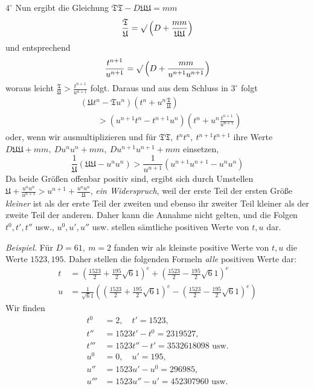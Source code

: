 \(4^\circ\) Nun ergibt die Gleichung \(\mathfrak{TT}-D\mathfrak{UU}=mm\)
\[
\frac{\mathfrak{T}}{\mathfrak{U}}=\surd\left(D+\frac{mm}{\mathfrak{UU}}\right)
\]
und entsprechend
\[
\frac{t^{n+1}}{u^{n+1}}=\surd\left(D+\frac{mm}{u^{n+1}u^{n+1}}\right)
\]
woraus leicht \(\frac{\mathfrak{T}}{\mathfrak{U}}>\frac{t^{n+1}}{u^{n+1}}\) folgt. Daraus und aus dem Schluss in \(3^\circ\) folgt
\[
\begin{aligned}&(\mathfrak{U}t^n-\mathfrak{T}u^n)\left(t^n+u^n\frac{\mathfrak{T}}{\mathfrak{U}}\right)\\&\qquad>(u^{n+1}t^n-t^{n+1}u^n)\left(t^n+u^n\frac{t^{n+1}}{u^{n+1}}\right)\end{aligned}
\]
oder, wenn wir ausmultiplizieren und für \(\mathfrak{TT},\ t^n t^n,\ t^{n+1}t^{n+1}\) ihre Werte \(D\mathfrak{UU}+mm,\ Du^n u^n+mm,\ Du^{n+1}u^{n+1}+mm\) einsetzen,
\[
\frac1{\mathfrak{U}}(\mathfrak{UU}-u^n u^n)>\frac1{u^{n+1}}(u^{n+1}u^{n+1}-u^n u^n)
\]
Da beide Größen offenbar positiv sind, ergibt sich durch Umstellen \(\mathfrak{U}+\frac{u^n u^n}{u^{n+1}}>u^{n+1}+\frac{u^n u^n}{\mathfrak{U}}\), \textit{ein Widerspruch}, weil der erste Teil der ersten Größe \textit{kleiner} ist
als der erste Teil der zweiten und ebenso ihr zweiter Teil kleiner als der zweite Teil der anderen. Daher kann die Annahme nicht gelten, und die Folgen \(t^0,t',t''\) usw., \(u^0,u',u''\) usw. stellen sämtliche positiven Werte von \(t,u\) dar.

\textit{Beispiel.} Für \(D=61,\ m=2\) fanden wir als kleinste positive Werte von \(t,u\) die Werte \(1523,195\). Daher stellen die folgenden Formeln \textit{alle} positiven Werte dar:
\[
\begin{aligned}
t&=\left(\frac{1523}{2}+\frac{195}{2}\surd61\right)^e+\left(\frac{1523}{2}-\frac{195}{2}\surd61\right)^e\\
u&=\frac1{\surd61}\left(\left(\frac{1523}{2}+\frac{195}{2}\surd61\right)^e-\left(\frac{1523}{2}-\frac{195}{2}\surd61\right)^e\right)
\end{aligned}
\]
Wir finden
\[
\begin{aligned}
t^0&=2,\quad t'=1523,\\
t''&=1523t'-t^0=2319527,\\
t'''&=1523t''-t'=3532618098\text{ usw.}\\
u^0&=0,\quad u'=195,\\
u''&=1523u'-u^0=296985,\\
u'''&=1523u''-u'=452307960\text{ usw.}
\end{aligned}
\]
